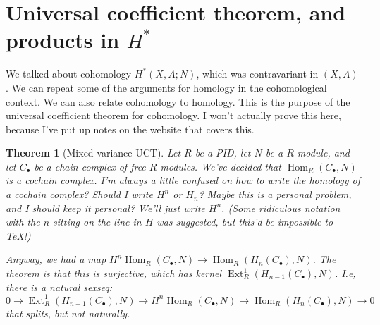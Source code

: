 \documentclass{amsart}
\theoremstyle{theorem}
\newtheorem{theorem}{Theorem}[section]
\theoremstyle{definition}
\DeclareMathOperator{\Ext}{Ext}
\DeclareMathOperator{\Hom}{Hom}
\begin{document}
\section{Universal coefficient theorem, and products in $ H^\ast$}
We talked about cohomology $ H^\ast(X,A;N)$, which was contravariant in $(X,A)$. We can repeat some of the arguments for homology in the cohomological context. We can also relate cohomology to homology. This is the purpose of the universal coefficient theorem for cohomology. I won't actually prove this here, because I've put up notes on the website that covers this.
\begin{theorem}[Mixed variance UCT]
Let $R$ be a PID, let $N$ be a $R$-module, and let $C_\bullet$ be a chain complex of free $R$-modules. We've decided that $\Hom_R(C_\bullet,N)$ is a cochain complex. I'm always a little confused on how to write the homology of a cochain complex? Should I write $ H^n$ or $ H_n$? Maybe this is a personal problem, and I should keep it personal? We'll just write $ H^n$. (Some ridiculous notation with the $n$ sitting on the line in $H$ was suggested, but this'd be \emph{impossible} to TeX!)

Anyway, we had a map $ H^n\Hom_R(C_\bullet,N)\to\Hom_R( H_n(C_\bullet),N)$. The theorem is that this is surjective, which has kernel $\Ext^1_R( H_{n-1}(C_\bullet),N)$. I.e, there is a natural sexseq:
\begin{equation*}
0\to\Ext^1_R( H_{n-1}(C_\bullet),N)\to H^n\Hom_R(C_\bullet,N)\to\Hom_R( H_n(C_\bullet),N)\to 0
\end{equation*}
that splits, but not naturally.
\end{theorem}
\end{document}
